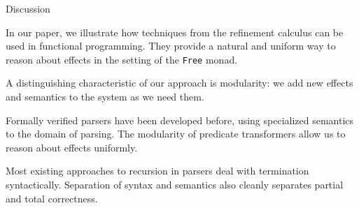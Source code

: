 \documentclass{beamer}
\newcommand{\Agda}[1]{\texttt{\footnotesize #1}\xspace}
\begin{document}
\begin{frame}{Discussion}

In our paper, we illustrate how techniques from the refinement calculus can be used in functional programming.
They provide a natural and uniform way to reason about effects in the setting of the \Agda{Free} monad.

A distinguishing characteristic of our approach is modularity:
we add new effects and semantics to the system as we need them.

Formally verified parsers have been developed before,
using specialized semantics to the domain of parsing.
The modularity of predicate transformers allow us to reason about effects uniformly.

Most existing approaches to recursion in parsers deal with termination syntactically.
Separation of syntax and semantics also cleanly separates partial and total correctness.

\end{frame}
\end{document}
